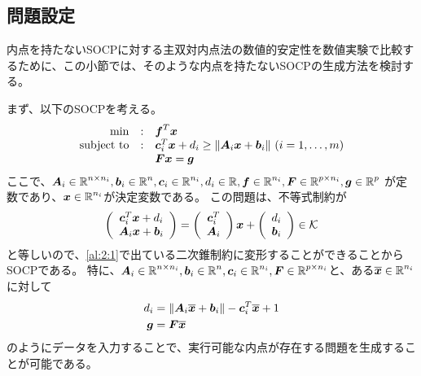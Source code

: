 \documentclass[11pt,a4paper,dvipdfmx,titlepage,uplatex]{jsarticle}
\theoremstyle{mystyle}
\newcommand{\0}{\mathbf{0}}
\def\b{\mbox{\boldmath $b$}}
\def\c{\mbox{\boldmath $c$}}
\def\f{\mbox{\boldmath $f$}}
\def\g{\mbox{\boldmath $g$}}
\def\x{\mbox{\boldmath $x$}}
\def\A{\mbox{\boldmath $A$}}
\def\F{\mbox{\boldmath $F$}}
\def\KC{\mbox{$\cal K$}}
\def\Real{\mbox{$\mathbb{R}$}}
\begin{document}
\subsection{問題設定}\label{sec:Second_Order_Cone_Programming_without_interiorpoint}

内点を持たないSOCPに対する主双対内点法の数値的安定性を数値実験で比較するために、この小節では、そのような内点を持たないSOCPの生成方法を検討する。

まず、以下のSOCPを考える。
\begin{align}
	\begin{array}{rcl}
		\min & : & \f^T \x \\
		\text{subject to} & : & \c_i^T \x + d_i \ge \|\A_i \x + \b_i\|
		\ (i=1, \ldots, m) \\
		& & \F \x = \g
	\end{array}
\end{align}
ここで、$\A_i \in \Real^{n \times n_i}, \b_i \in \Real^{n}, \c_i \in \Real^{n_i}, d_i \in \Real, \f \in \Real^{n_i} , \F \in \Real^{p \times n_i}, \g \in \Real^p$
が定数であり、$\x \in \Real^{n_i}$が決定変数である。
この問題は、不等式制約が
\begin{align}
  \left(
  \begin{array}{c}
    \c_i^T \x + d_i \\
    \A_i \x + \b_i
  \end{array}
  \right) = \left(
  \begin{array}{c}
    \c_i^T \\
    \A_i
  \end{array}
  \right) \x + \left(
  \begin{array}{c}
    d_i \\
    \b_i
  \end{array}
  \right) \in \KC
\end{align}
と等しいので、\eqref{al:2:1}で出ている二次錐制約に変形することができることからSOCPである。
特に、$\A_i \in \Real^{n \times n_i}, \b_i \in \Real^{n},
\c_i \in \Real^{n_i}, \F \in \Real^{p \times n_i}$と、ある$\overline{\x} \in \Real^{n_i}$に対して
\begin{align}
  d_i &= \|\A_i \overline{\x} + \b_i\| - \c_i^T \overline{\x} + 1 \\
  \g &= \F \overline{\x}
\end{align}
のようにデータを入力することで、実行可能な内点が存在する問題を生成することが可能である。
\end{document}
